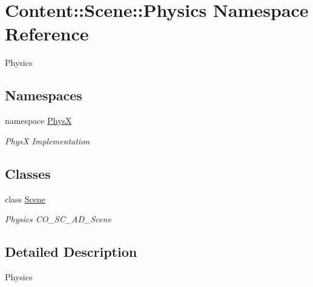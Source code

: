 \hypertarget{namespaceContent_1_1Scene_1_1Physics}{
\section{Content::Scene::Physics Namespace Reference}
\label{namespaceContent_1_1Scene_1_1Physics}
}


Physics  
\subsection*{Namespaces}
\begin{DoxyCompactItemize}
\item 
namespace \hyperlink{namespaceContent_1_1Scene_1_1Physics_1_1PhysX}{PhysX}


\begin{DoxyCompactList}\small\item\em PhysX Implementation \item\end{DoxyCompactList}\end{DoxyCompactItemize}
\subsection*{Classes}
\begin{DoxyCompactItemize}
\item 
class \hyperlink{classContent_1_1Scene_1_1Physics_1_1Scene}{Scene}
\begin{DoxyCompactList}\small\item\em Physics CO\_\-SC\_\-AD\_\-Scene \item\end{DoxyCompactList}\end{DoxyCompactItemize}


\subsection{Detailed Description}
Physics 